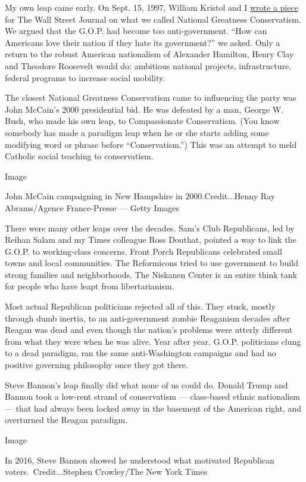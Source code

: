 My own leap came early. On Sept. 15, 1997, William Kristol and I
\href{https://www.wsj.com/articles/SB874276753849168000}{wrote a piece}
for The Wall Street Journal on what we called National Greatness
Conservatism. We argued that the G.O.P. had become too anti-government.
``How can Americans love their nation if they hate its government?'' we
asked. Only a return to the robust American nationalism of Alexander
Hamilton, Henry Clay and Theodore Roosevelt would do: ambitious national
projects, infrastructure, federal programs to increase social mobility.

The closest National Greatness Conservatism came to influencing the
party was John McCain's 2000 presidential bid. He was defeated by a man,
George W. Bush, who made his own leap, to Compassionate Conservatism.
(You know somebody has made a paradigm leap when he or she starts adding
some modifying word or phrase before ``Conservatism.'') This was an
attempt to meld Catholic social teaching to conservatism.

Image

John McCain campaigning in New Hampshire in 2000.Credit...Henny Ray
Abrams/Agence France-Presse --- Getty Images

There were many other leaps over the decades. Sam's Club Republicans,
led by Reihan Salam and my Times colleague Ross Douthat, pointed a way
to link the G.O.P. to working-class concerns. Front Porch Republicans
celebrated small towns and local communities. The Reformicons tried to
use government to build strong families and neighborhoods. The Niskanen
Center is an entire think tank for people who have leapt from
libertarianism.

Most actual Republican politicians rejected all of this. They stuck,
mostly through dumb inertia, to an anti-government zombie Reaganism
decades after Reagan was dead and even though the nation's problems were
utterly different from what they were when he was alive. Year after
year, G.O.P. politicians clung to a dead paradigm, ran the same
anti-Washington campaigns and had no positive governing philosophy once
they got there.

Steve Bannon's leap finally did what none of us could do. Donald Trump
and Bannon took a low-rent strand of conservatism --- class-based ethnic
nationalism --- that had always been locked away in the basement of the
American right, and overturned the Reagan paradigm.

Image

In 2016, Steve Bannon showed he understood what motivated Republican
voters.~Credit...Stephen Crowley/The New York Times

